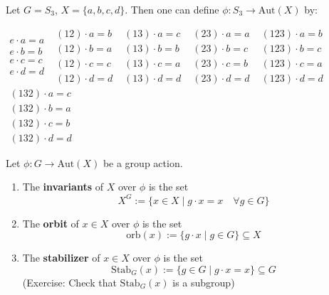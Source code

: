 \begin{example}
Let $G = S_3$, $X = \{a,b,c,d\}$. Then one can define $\phi: S_3 \to \mathrm{Aut}(X)$ by:
\begin{center}
$\begin{matrix} e \cdot a = a\\
e \cdot b = b\\
e \cdot c = c\\
e \cdot d = d \end{matrix}$ \quad \quad  $\begin{matrix} (12) \cdot a = b\\
(12) \cdot b = a\\
(12) \cdot c = c\\
(12) \cdot d = d \end{matrix}$  \quad \quad  $\begin{matrix} (13) \cdot a = c\\
(13) \cdot b = b\\
(13) \cdot c = a\\
(13) \cdot d = d \end{matrix}$  \quad \quad $\begin{matrix} (23) \cdot a = a\\
(23) \cdot b = c\\
(23) \cdot c = b\\
(23) \cdot d = d \end{matrix}$ \quad \quad  $\begin{matrix} (123) \cdot a = b\\
(123) \cdot b = c\\
(123) \cdot c = a\\
(123) \cdot d = d \end{matrix}$  \quad \quad  $\begin{matrix} (132) \cdot a = c\\
(132) \cdot b = a\\
(132) \cdot c = b\\
(132) \cdot d = d \end{matrix}$  
\end{center}

\end{example}

\begin{definition} Let $\phi : G \to \mathrm{Aut}(X)$ be a group action.
\begin{enumerate}
    \item The \textbf{invariants} of $X$ over $\phi$ is the set
    \[
    X^G := \{x \in X \mid g \cdot x = x \quad \forall g \in G\}
    \]
    \item The \textbf{orbit} of $x \in X$ over $\phi$ is the set
    \[
    \mathrm{orb}(x) := \{g \cdot x \mid g \in G\} \subseteq X
    \]
    \item The \textbf{stabilizer} of $x \in X$ over $\phi$ is the set
    \[
    \mathrm{Stab}_G(x) := \{g \in G \mid g \cdot x = x\} \subseteq G
    \]
    (Exercise: Check that $\mathrm{Stab}_G(x)$ is a subgroup)
\end{enumerate}
\end{definition}

